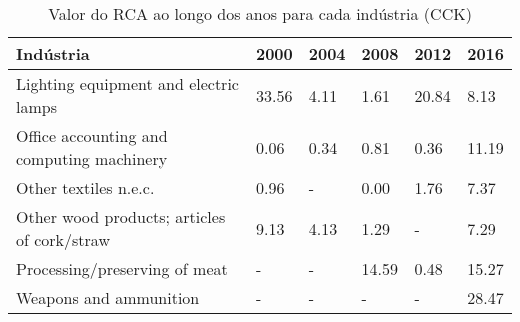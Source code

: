\begin{table}
\centering
\caption{Valor do RCA ao longo dos anos para cada indústria (CCK)}
\label{tab:ex3-tempo-CCK}
\begin{tabular}{p{6cm}p{1.5cm}p{1.5cm}p{1.5cm}p{1.5cm}p{1.5cm}}
\toprule
                                  Indústria &  2000 & 2004 &  2008 &  2012 &  2016 \\
\midrule
      Lighting equipment and electric lamps & 33.56 & 4.11 &  1.61 & 20.84 &  8.13 \\
  Office accounting and computing machinery &  0.06 & 0.34 &  0.81 &  0.36 & 11.19 \\
                      Other textiles n.e.c. &  0.96 &    - &  0.00 &  1.76 &  7.37 \\
Other wood products; articles of cork/straw &  9.13 & 4.13 &  1.29 &     - &  7.29 \\
              Processing/preserving of meat &     - &    - & 14.59 &  0.48 & 15.27 \\
                     Weapons and ammunition &     - &    - &     - &     - & 28.47 \\
\bottomrule
\end{tabular}
\end{table}
